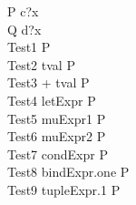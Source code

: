 \begin{circus}
    \circprocess P \circdef \circbegin \circspot c?x \then \Skip \circend \\
    \circprocess Q \circdef \circbegin \circspot d?x \then \Skip \circend \\

    \circprocess Test1 \circdef {} \rcirctime \circstartby P \\
    \circprocess Test2 \circdef \lcirctime tval \rcirctime \circstartby P \\
    \circprocess Test3 \circdef {} + tval \rcirctime \circstartby P \\
    
    \circprocess Test4 \circdef \lcirctime letExpr \rcirctime \circstartby P \\
    
    \circprocess Test5 \circdef \lcirctime muExpr1 \rcirctime \circstartby P \\
    \circprocess Test6 \circdef \lcirctime muExpr2 \rcirctime \circstartby P \\
    
    \circprocess Test7 \circdef \lcirctime condExpr \rcirctime \circstartby P \\
    
    \circprocess Test8 \circdef \lcirctime bindExpr.one \rcirctime \circstartby P \\
    
    \circprocess Test9 \circdef \lcirctime tupleExpr.1 \rcirctime \circstartby P \\

\end{circus}

